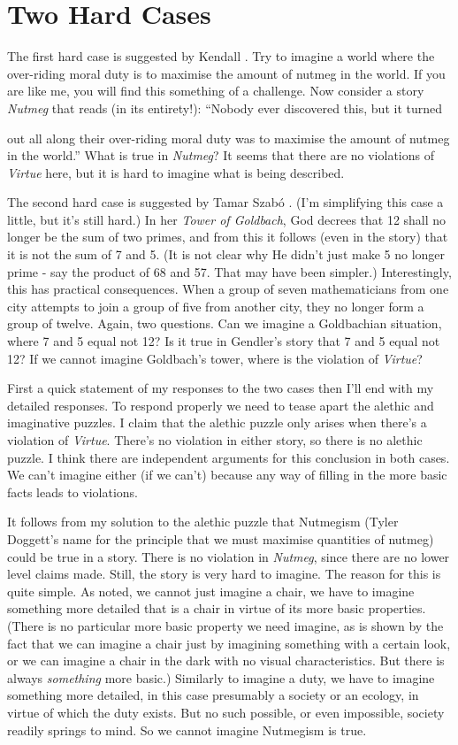\section{Two Hard Cases}
The first hard case is suggested by Kendall \citet{Walton1994}. Try to imagine a world where the over-riding moral duty is to maximise the amount of nutmeg in the world. If you are like me, you will find this something of a challenge. Now consider a story \textit{Nutmeg }that reads (in its entirety!): ``Nobody ever discovered this, but it turned {out all along their over-riding moral duty was to maximise the amount of nutmeg in the world.'' What is true in \textit{Nutmeg}? It seems that there are no violations of \textit{Virtue} here, but it is hard to imagine what is being described.

The second hard case is suggested by Tamar Szab\'{o} \citet{Gendler2000}. (I'm simplifying this case a little, but it's still hard.) In her \textit{Tower of Goldbach}, God decrees that 12 shall no longer be the sum of two primes, and from this it follows (even in the story) that it is not the sum of 7 and 5. (It is not clear why He didn't just make 5 no longer prime - say the product of 68 and 57. That may have been simpler.) Interestingly, this has practical consequences. When a group of seven mathematicians from one city attempts to join a group of five from another city, they no longer form a group of twelve. Again, two questions. Can we imagine a Goldbachian situation, where 7 and 5 equal not 12? Is it true in Gendler's story that 7 and 5 equal not 12? If we cannot imagine Goldbach's tower, where is the violation of \textit{Virtue}?

First a quick statement of my responses to the two cases then I'll end with my detailed responses. To respond properly we need to tease apart the alethic and imaginative puzzles. I claim that the alethic puzzle only arises when there's a violation of \textit{Virtue}. There's no violation in either story, so there is no alethic puzzle. I think there are independent arguments for this conclusion in both cases. We can't imagine either (if we can't) because any way of filling in the more basic facts leads to violations.

It follows from my solution to the alethic puzzle that Nutmegism (Tyler Doggett's name for the principle that we must maximise quantities of nutmeg) could be true in a story. There is no violation in \textit{Nutmeg}, since there are no lower level claims made. Still, the story is very hard to imagine. The reason for this is quite simple. As noted, we cannot just imagine a chair, we have to imagine something more detailed that is a chair in virtue of its more basic properties. (There is no particular more basic property we need imagine, as is shown by the fact that we can imagine a chair just by imagining something with a certain look, or we can imagine a chair in the dark with no visual characteristics. But there is always \textit{something} more basic.) Similarly to imagine a duty, we have to imagine something more detailed, in this case presumably a society or an ecology, in virtue of which the duty exists. But no such possible, or even impossible, society readily springs to mind. So we cannot imagine Nutmegism is true.

}
